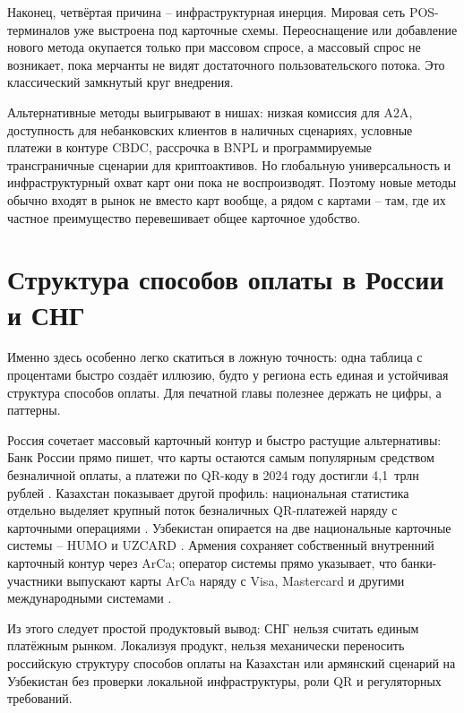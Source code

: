 Наконец, четвёртая причина -- инфраструктурная инерция. Мировая сеть
POS-терминалов уже выстроена под карточные схемы. Переоснащение
или добавление нового метода окупается только при массовом спросе, а
массовый спрос не возникает, пока мерчанты не видят достаточного
пользовательского потока. Это классический замкнутый круг внедрения.

Альтернативные методы выигрывают в нишах: низкая комиссия для
A2A, доступность для небанковских клиентов в наличных сценариях,
условные платежи в контуре CBDC, рассрочка в BNPL и программируемые
трансграничные сценарии для криптоактивов. Но глобальную
универсальность и инфраструктурный охват карт они пока не
воспроизводят. Поэтому новые методы обычно входят в рынок не вместо
карт вообще, а рядом с картами -- там, где их частное преимущество
перевешивает общее карточное удобство.

\section{Структура способов оплаты в России и СНГ}
\label{sec:alt-mix}

Именно здесь особенно легко скатиться в ложную точность: одна таблица
с процентами быстро создаёт иллюзию, будто у региона есть единая и
устойчивая структура способов оплаты. Для печатной главы полезнее
держать не цифры, а паттерны.

Россия сочетает массовый карточный контур и быстро растущие
альтернативы: Банк России прямо пишет, что карты остаются самым
популярным средством безналичной оплаты, а платежи по QR-коду
в 2024 году достигли 4{,}1~трлн рублей
\cite{cbr-results-2024-payments}. Казахстан показывает другой
профиль: национальная статистика отдельно выделяет крупный поток
безналичных QR-платежей наряду с карточными операциями
\cite{nbk-payment-cards-2025jan}. Узбекистан опирается на две
национальные карточные системы -- HUMO и UZCARD
\cite{humo-faq}\cite{uzcard-about}. Армения сохраняет
собственный внутренний карточный контур через ArCa; оператор
системы прямо указывает, что банки-участники выпускают карты ArCa
наряду с Visa, Mastercard и другими международными
системами \cite{arca-about}.

Из этого следует простой продуктовый вывод: СНГ нельзя считать единым
платёжным рынком. Локализуя продукт, нельзя механически переносить
российскую структуру способов оплаты на Казахстан или армянский
сценарий на Узбекистан без проверки локальной инфраструктуры, роли
QR и регуляторных требований.

